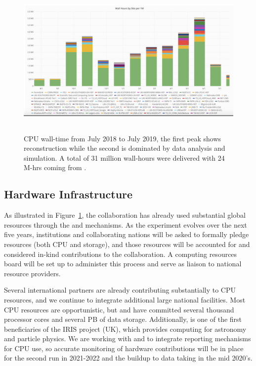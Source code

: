 \begin{figure}[htp]
\centering
\includegraphics[height=3in]{graphics/comp-ComputingLastYear.png}
\caption[CPU wall-time from July 2018 to July 2019]{CPU wall-time from July 2018 to July 2019, the first peak shows   reconstruction while the second is dominated by data analysis and  simulation. A total of 31 million wall-hours were delivered with 24 M-hrs coming from \fnal.  }
\label{fig:ch-exec-comp-cpupie-es}
\end{figure}

\subsection{Hardware Infrastructure}
\label{sec:exec-comp-hi}

As illustrated in Figure~\ref{fig:ch-exec-comp-cpupie-es}, the  collaboration has already used substantial global resources through the  and  mechanisms. As the experiment evolves over the next five years, institutions and collaborating nations will be asked to formally pledge resources (both CPU and storage), and those resources will be accounted for and considered in-kind contributions to the collaboration.  A   computing resources board  will be set up to administer this process and serve as liaison to national resource providers. 

Several international partners are already contributing substantially to CPU resources, and we continue to  integrate additional large national facilities. Most CPU resources are opportunistic, but  and  have committed several thousand processor cores and several PB of data storage. Additionally,   is one of the first beneficiaries of the IRIS project (UK), which provides computing for astronomy and particle physics.  
We are working with  and  to integrate reporting mechanisms for CPU use, so accurate monitoring of hardware contributions will be in place for the second  run in 2021-2022 and the buildup to data taking in the mid 2020's. 

